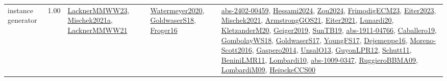 {\begin{longtable}{p{3cm}r>{\raggedright\arraybackslash}p{6cm}>{\raggedright\arraybackslash}p{6cm}>{\raggedright\arraybackslash}p{8cm}}
\index{instance generator}\index{Benchmarks!instance generator}instance generator &  1.00 & \hyperref[detail:LacknerMMWW23]{LacknerMMWW23}, \hyperref[detail:Mischek2021a]{Mischek2021a}, \hyperref[detail:LacknerMMWW21]{LacknerMMWW21} & \hyperref[detail:Watermeyer2020]{Watermeyer2020}, \hyperref[detail:GoldwaserS18]{GoldwaserS18}, \hyperref[detail:Froger16]{Froger16} & \hyperref[detail:abs-2402-00459]{abs-2402-00459}, \hyperref[detail:Hessami2024]{Hessami2024}, \hyperref[detail:Zou2024]{Zou2024}, \hyperref[detail:FrimodigECM23]{FrimodigECM23}, \hyperref[detail:Eiter2023]{Eiter2023}, \hyperref[detail:Mischek2021]{Mischek2021}, \hyperref[detail:ArmstrongGOS21]{ArmstrongGOS21}, \hyperref[detail:Eiter2021]{Eiter2021}, \hyperref[detail:Lunardi20]{Lunardi20}, \hyperref[detail:KletzanderM20]{KletzanderM20}, \hyperref[detail:Geiger2019]{Geiger2019}, \hyperref[detail:SunTB19]{SunTB19}, \hyperref[detail:abs-1911-04766]{abs-1911-04766}, \hyperref[detail:Caballero19]{Caballero19}, \hyperref[detail:GombolayWS18]{GombolayWS18}, \hyperref[detail:GoldwaserS17]{GoldwaserS17}, \hyperref[detail:YoungFS17]{YoungFS17}, \hyperref[detail:Dejemeppe16]{Dejemeppe16}, \hyperref[detail:Moreno-Scott2016]{Moreno-Scott2016}, \hyperref[detail:Gaspero2014]{Gaspero2014}, \hyperref[detail:UnsalO13]{UnsalO13}, \hyperref[detail:GuyonLPR12]{GuyonLPR12}, \hyperref[detail:Schutt11]{Schutt11}, \hyperref[detail:BeniniLMR11]{BeniniLMR11}, \hyperref[detail:Lombardi10]{Lombardi10}, \hyperref[detail:abs-1009-0347]{abs-1009-0347}, \hyperref[detail:RuggieroBBMA09]{RuggieroBBMA09}, \hyperref[detail:LombardiM09]{LombardiM09}, \hyperref[detail:HeipckeCCS00]{HeipckeCCS00}\\

\end{longtable}}
